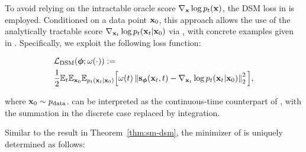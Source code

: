 To avoid relying on the intractable oracle score $\nabla_{{\mathbf{x}}} \log p_t({\mathbf{x}})$, the DSM loss in  is employed. Conditioned on a data point ${\mathbf{x}}_0$, this approach allows the use of the analytically tractable score $\nabla_{{\mathbf{x}}_t} \log p_t({\mathbf{x}}_t|{\mathbf{x}}_0)$ via , with concrete examples given in . Specifically, we exploit the following loss function:
\begin{mdframed}
    \begin{equation}\label{eq:conti-dsm_loss-real}
\begin{aligned}
     &\mathcal{L}_{\text{DSM}}(\bm{\phi}; \omega(\cdot)) := \\
     &\frac{1}{2} \mathbb{E}_{t}  \mathbb{E}_{{\mathbf{x}}_0} \mathbb{E}_{ p_t({\mathbf{x}}_t|{\mathbf{x}}_0)} \Big[\omega(t)\left\lVert\mathbf{s}_{\bm{\phi}}({\mathbf{x}}_t, t) - \nabla_{{\mathbf{x}}_t} \log p_t({\mathbf{x}}_t|{\mathbf{x}}_0)\right\rVert_2^2 \Big],
\end{aligned}
\end{equation}
\end{mdframed}
where ${\mathbf{x}}_0 \sim p_{\mathrm{data}}$.  can be interpreted as the continuous-time counterpart of , with the summation in the discrete case replaced by integration. 


Similar to the result in Theorem~\ref{thm:sm-dsm}, the minimizer of  is uniquely determined as follows:



